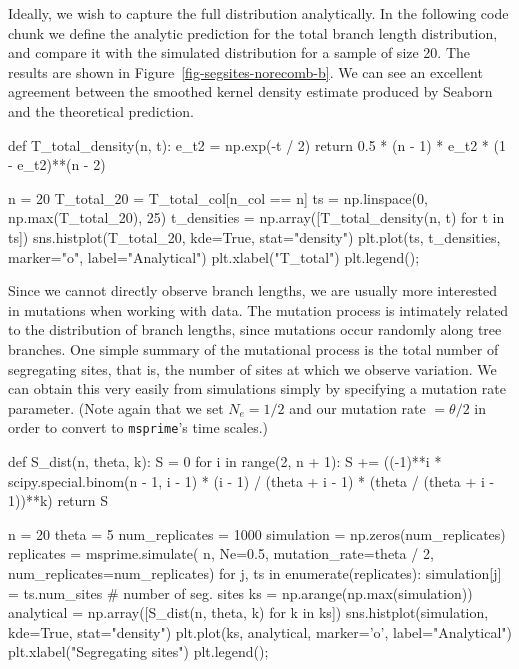 \documentclass[graybox]{svmult}
\newcommand{\msprime}[0]{\texttt{msprime}}
\begin{document}
    Ideally, we wish to capture the full distribution analytically. In the following code chunk we define the analytic
prediction for the total branch length distribution, and compare it with the simulated distribution for a sample of size 20. The results are shown in
Figure~\ref{fig-segsites-norecomb-b}. We can see an excellent agreement between
the smoothed kernel
density estimate produced by Seaborn and the theoretical prediction.

\begin{pythoncode}
def T_total_density(n, t):
    e_t2 = np.exp(-t / 2)
    return 0.5 * (n - 1) * e_t2 * (1 - e_t2)**(n - 2)

n = 20
T_total_20 = T_total_col[n_col == n]
ts = np.linspace(0, np.max(T_total_20), 25)
t_densities = np.array([T_total_density(n, t) for t in ts])
sns.histplot(T_total_20, kde=True,
    stat="density")
plt.plot(ts, t_densities, marker="o", label="Analytical")
plt.xlabel("T_total")
plt.legend();
\end{pythoncode}

Since we cannot directly observe branch lengths, we are usually more
interested in mutations when working with data. The mutation process is
intimately related to the distribution of branch lengths, since
mutations occur randomly along tree branches. One simple summary of the
mutational process is the total number of segregating sites, that is, the number of
sites at which we observe variation. We can obtain this very
easily from simulations simply by specifying a mutation rate parameter.
(Note again that we set \(N_e=1/2\) and our mutation rate
\(= \theta / 2\) in order to convert to \msprime's time scales.)

\begin{pythoncode}
def S_dist(n, theta, k):
    S = 0
    for i in range(2, n + 1):
        S += ((-1)**i * scipy.special.binom(n - 1, i - 1)
              * (i - 1) / (theta + i - 1)
              * (theta / (theta + i - 1))**k)
    return S

n = 20
theta = 5
num_replicates = 1000
simulation = np.zeros(num_replicates)
replicates = msprime.simulate(
    n, Ne=0.5, mutation_rate=theta / 2, num_replicates=num_replicates)
for j, ts in enumerate(replicates):
    simulation[j] = ts.num_sites  # number of seg. sites
ks = np.arange(np.max(simulation))
analytical = np.array([S_dist(n, theta, k) for k in ks])
sns.histplot(simulation, kde=True,
    stat="density")
plt.plot(ks, analytical, marker='o', label="Analytical")
plt.xlabel("Segregating sites")
plt.legend();
\end{pythoncode}
\end{document}
